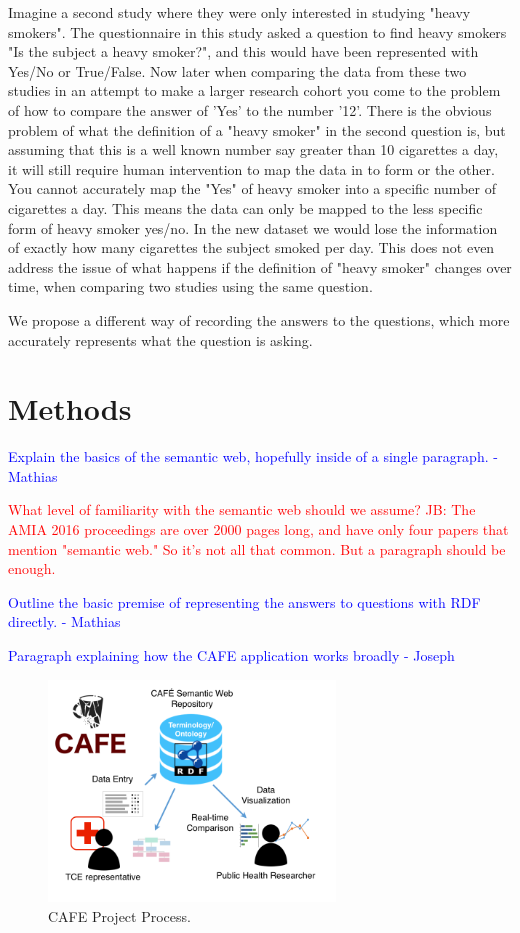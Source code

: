 \documentclass{amia}
\begin{document}
Imagine a second study where they were only interested in studying "heavy smokers".
The questionnaire in this study asked a question to find heavy smokers "Is the subject a heavy smoker?", and this would have been represented with Yes/No or True/False.
Now later when comparing the data from these two studies in an attempt to make a larger research cohort you come to the problem of how to compare the answer of 'Yes' to the number '12'.
There is the obvious problem of what the definition of a "heavy smoker" in the second question is, but assuming that this is a well known number say greater than 10 cigarettes a day, it will still require human intervention to map the data in to form or the other.
You cannot accurately map the "Yes" of heavy smoker into a specific number of cigarettes a day.
This means the data can only be mapped to the less specific form of heavy smoker yes/no.
In the new dataset we would lose the information of exactly how many cigarettes the subject smoked per day.
This does not even address the issue of what happens if the definition of "heavy smoker" changes over time, when comparing two studies using the same question.

We propose a different way of recording the answers to the questions, which more accurately represents what the question is asking.

\section*{Methods}
\textcolor{blue}{Explain the basics of the semantic web, hopefully inside of a single paragraph. - Mathias}

\textcolor{red}{What level of familiarity with the semantic web should we assume?}
\textcolor{red}{JB: The AMIA 2016 proceedings are over 2000 pages long, and have only four papers that mention "semantic web." So it's not all that common. But a paragraph should be enough.}

\textcolor{blue}{Outline the basic premise of representing the answers to questions with RDF directly. - Mathias}

\textcolor{blue}{Paragraph explaining how the CAFE application works broadly - Joseph}

\begin{figure}
  \begin{center}
    \includegraphics[width=0.68\textwidth]{pics/cafe_figure.png}
  \end{center}
  \caption{CAFE Project Process.}
  \label{cafe_figure}
\end{figure}
\end{document}
